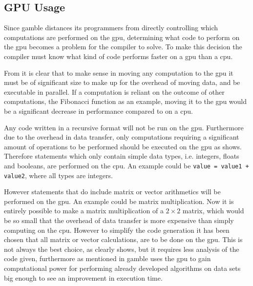 \subsection*{GPU Usage}\label{GPUCode}
Since \gls{gamble} distances its programmers from directly controlling which computations are performed on the \acrshort{gpu}, determining what code to perform on the \acrshort{gpu} becomes a problem for the compiler to solve.
To make this decision the compiler must know what kind of code performs faster on a \acrshort{gpu} than a \acrshort{cpu}.

From  it is clear that to make sense in moving any computation to the \acrshort{gpu} it must be of significant size to make up for the overhead of moving data, and be executable in parallel.
If a computation is reliant on the outcome of other computations, the Fibonacci function as an example, moving it to the \acrshort{gpu} would be a significant decrease in performance compared to on a \acrshort{cpu}.

Any code written in a recursive format will not be run on the \acrshort{gpu}. 
Furthermore due to the overhead in data transfer, only computations requiring a significant amount of operations to be performed should be executed on the \acrshort{gpu} as  shows.
Therefore statements which only contain simple data types, i.e. integers, floats and booleans, are performed on the \acrshort{cpu}.
An example could be \texttt{value = value1 + value2}, where all types are integers.

However statements that do include matrix or vector arithmetics will be performed on the \acrshort{gpu}.
An example could be matrix multiplication.
Now it is entirely possible to make a matrix multiplication of a $2\times2$ matrix, which would be so small that the overhead of data transfer is more expensive than simply computing on the \acrshort{cpu}.
However to simplify the code generation it has been chosen that all matrix or vector calculations, are to be done on the \acrshort{gpu}.
This is not always the best choice, as  clearly shows, but it requires less analysis of the code given, furthermore as mentioned in  \gls{gamble} uses the \acrshort{gpu} to gain computational power for performing already developed algorithms on data sets big enough to see an improvement in execution time.

